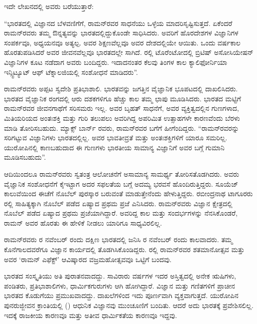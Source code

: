 ಇದೇ ಲೇಖನದಲ್ಲಿ ಅವರು ಬರೆಯುತ್ತಾರೆ:\enginline{-}

“ಭಾರತದಲ್ಲಿ ವಿಜ್ಞಾನದ ಬೆಳವಣಿಗೆಗೆ, ರಾಮನ್‍ರವರ ಸಾಧನೆಯು ಒಳ್ಳೆಯ ಮಾದರಿ\break ಸೃಷ್ಟಿಸುತ್ತದೆ. ಏಕೆಂದರೆ ರಾಮನ್‍ರವರು ತಮ್ಮ ಔನ್ನತ್ಯವನ್ನು ಭಾರತದಲ್ಲಿದ್ದುಕೊಂಡೇ ಸಾಧಿಸಿದರು. ಅವರಿಗೆ ಹೊರದೇಶಗಳ ವಿಜ್ಞಾನಿಗಳ ಸಂಪರ್ಕವೂ, ಅಧ್ಯಯನವೂ ಅತ್ಯಲ್ಪ. ಅವರ ಶಿಕ್ಷಣವೆಲ್ಲವೂ ಅವರ ದೇಶದಲ್ಲಿಯೇ ಆಯಿತು. ಒಂದು ವರ್ಷಕಾಲ ಹೊರತುಪಡಿಸಿದರೆ ಅವರ ಜೀವನವೆಲ್ಲವೂ ಭಾರತದಲ್ಲೇ ಸಾಗಿದೆ. ರಲ್ಲಿ ಟೊರೆಂಟೋದಲ್ಲಿ ಬ್ರಿಟಿಷ್ ಅಸೋಸಿಯೇಷನ್ ವಿಜ್ಞಾನಿಗಳ ಕೂಟ ನಡೆದಾಗ ಅವರು ಬಂದಿದ್ದರು. ಇದಾದನಂತರ ಕೆಲವು ತಿಂಗಳ ಕಾಲ ಕ್ಯಾಲಿಫೋರ್ನಿಯಾ ಇನ್ಸ್ಟಿಟ್ಯೂಟ್ ಆಫ್ ಟೆಕ್ನಾಲಜಿಯಲ್ಲಿ ಸಂಶೋಧನೆ ಮಾಡಿದರು”.

ರಾಮನ್‍ರವರು ಅಪ್ಪಟ ಸ್ವದೇಶಿ ಪ್ರತಿಭಾಶಾಲಿ. ಭಾರತವನ್ನು ಜಗತ್ತಿನ ವೈಜ್ಞಾನಿಕ ಭೂಪಟದಲ್ಲಿ ದಾಖಲಿಸಿದರು. ಭಾರತದ ವೈಜ್ಞಾನಿಕ ರಂಗದಲ್ಲಿ ಆರು ದಶಕಗಳಿಗೂ ಹೆಚ್ಚು ಕಾಲ ತಮ್ಮ ಛಾಪು ಮೂಡಿಸಿದರು. ಭಾರತದ ಮಟ್ಟಿಗೆ ರಾಮನ್‍ರವರ ಜೀವನಗಾಥೆಗೆ ಸರಿಸಮರು ಇಲ್ಲ. ಅವರ ಬೃಹತ್ ಸಾಧನೆಗೆ, ಅವರ ವ್ಯಕ್ತಿತ್ವದಲ್ಲಿನ ಗುಣಗಳಾದ, ಮಿತಿಯರಿಯದ ಅಂತಃಶಕ್ತಿ ಮತ್ತು ಗುರಿ ತಲುಪಲು ಅವರಿಗಿದ್ದ ಅಪರಿಮಿತ ಉತ್ಸಾಹಗಳೇ ಕಾರಣವೆಂದು ಬೆರಳು ಮಾಡಿ ತೋರಿಸಬಹುದು. ಮ್ಯಾಕ್ಸ್ ಬಾರ್ನ್ ರವರು, ರಾಮನ್‍ರವರ ಬಗೆಗೆ ಹೀಗೆಂದಿದ್ದರು.  “ರಾಮನ್‍ರವರನ್ನು ಸರಿಗಟ್ಟುವ ವಿಜ್ಞಾನಿಗಳು ಭಾರತದಲ್ಲಿಲ್ಲ. ಅವರ ಭಾವತೀವ್ರತೆ ಮತ್ತು ಅಂತಃಶಕ್ತಿಗಳಿಗೆ ಯಾರೂ ಸಮರಿಲ್ಲ. ಯುರೋಪಿನಲ್ಲಿ ಕಾಣಬಹುದಾದ ಈ ಗುಣಗಳು ಭಾರತೀಯ ಸಾಮಾನ್ಯ ವಿಜ್ಞಾನಿಗೆ ಅವರ ಬಗ್ಗೆ ಗುಮಾನಿ ಮೂಡಿಸಬಹುದು”.

ಆದಿಯಿಂದಲೂ ರಾಮನ್‍ರವರು ಸ್ವತಂತ್ರ ಆಲೋಚನೆಗೆ ಅಸಾಮಾನ್ಯ ಸಾಮರ್ಥ್ಯ ತೋರಿಸ\-ತೊಡಗಿದರು. ಅವರು ವೈಜ್ಞಾನಿಕ ಸಂಶೋಧನೆಗೆ ಕೈಇಟ್ಟಾಗ ಅದರ ಸಫಲತೆಯ ಬಗ್ಗೆ ಅದಮ್ಯ ಭರವಸೆ ಹೊಂದಿರುತ್ತಿದ್ದರು. ಸೂಯೆಜ್ ಕಾಲುವೆಯಿಂದ ಈಚೆಗೆ ನೊಬೆಲ್ ಪುರಸ್ಕಾರ ಬರುವಂತೆ ಮಾಡುತ್ತೇನೆಂದು ಹೇಳುತ್ತಿದ್ದರು. ರಬೀಂದ್ರನಾಥ ಟಾಗೂರರು ರಲ್ಲಿ ಸಾಹಿತ್ಯಕ್ಕಾಗಿ ನೊಬೆಲ್ ಪಡೆದ ಏಷ್ಯಾದ ಪ್ರಥಮ ಪ್ರಜೆ ಎನಿಸಿದರು. ರಾಮನ್‍ರವರು ವಿಜ್ಞಾನ ಕ್ಷೇತ್ರದಲ್ಲಿ ನೊಬೆಲ್ ಪಡೆದ ಏಷ್ಯಾದ ಪ್ರಥಮ ಪ್ರಜೆಯಾಗಿದ್ದಾರೆ. ಅವರಿದ್ದ ಕಾಲ ಮತ್ತು ಸಂದರ್ಭಗಳನ್ನು ನೆನಸಿಕೊಂಡರೆ, ರಾಮನ್‍ ಅವರ ಹೊರತು ಈ ಹೇಳಿಕೆ ನೀಡಲು ಯಾರಿಗೂ ಸಾಧ್ಯವಿರಲಿಲ್ಲ.

ರಾಮನ್‍ರವರು ರ ನವೆಂಬರ್ ರಂದು ದಕ್ಷಿಣ ಭಾರತದಲ್ಲಿ ಜನಿಸಿ ರ ನವೆಂಬರ್ ರಂದು ಕಾಲವಾದರು. ತಮ್ಮ ಕೊನೆಗಾಲದವರೆಗೂ ವಿಜ್ಞಾನ ಕಾರ್ಯದಲ್ಲಿ ತೊಡಗಿಸಿಕೊಂಡಿದ್ದರು. ರಲ್ಲಿ ರಾಮನ್‍ರವರ ಶತಮಾನೋತ್ಸವ ಮತ್ತು ಅವರ ‘ರಾಮನ್ ಎಫೆಕ್ಟ್’ ಆವಿಷ್ಕಾರದ ವಜ್ರಮಹೋತ್ಸವವೂ ಒಟ್ಟಿಗೆ ಬಂದವು.



ಭಾರತದ ಸಂಸ್ಕೃತಿಯು ಅತಿ ಪುರಾತನವಾದದ್ದು. ಸಾವಿರಾರು ವರ್ಷಗಳ ಇದರ ಅಸ್ತಿತ್ವದಲ್ಲಿ ಅನೇಕ ಋಷಿಗಳು, ಪಂಡಿತರು, ಪ್ರತಿಭಾಶಾಲಿಗಳು, ಧಾರ್ಮಿಕಗುರುಗಳು ಆಗಿ ಹೋಗಿದ್ದಾರೆ. ವಿಜ್ಞಾನ ಮತ್ತು ಗಣಿತಗಳಿಗೆ ಪ್ರಾಚೀನ ಭಾರತದ ಕೊಡುಗೆಯು ಪ್ರಮುಖವಾದದ್ದು. ದಾಖಲೆಗಳಿಂದ ಇದು ಪೂರ್ಣವಾಗಿ ವ್ಯಕ್ತವಾಗುತ್ತದೆ. ಯುರೋಪಿನ ಪುನರುಜ್ಜೀವನ ಕ್ರಾಂತಿಯಲ್ಲಿ () ಆಧುನಿಕ ವಿಜ್ಞಾನವು ಮುಂಚೂಣಿಗೆ ಬಂದಿತು. ಆದರೆ ಅದು ಭಾರತಕ್ಕೆ ಪ್ರವೇಶಿಸಲಿಲ್ಲ. ಇದಕ್ಕೆ ರಾಜಕೀಯ ಕಾರಣವೂ ಮತ್ತು ಅತೀವ ಧಾರ್ಮಿಕತೆಯ ಕಾರಣವೂ ಇದ್ದವು.

